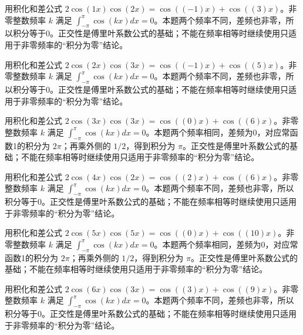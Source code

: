 \documentclass[12pt,fontset=fandol]{ctexart}
\begin{document}
\begin{solve}\label{ans:c16q13}
用积化和差公式 $2\cos(1x)\cos(2x)=\cos((-1)x)+\cos((3)x)$。非零整数频率 $k$ 满足 $\int_{-\pi}^\pi\cos(kx)dx=0$。本题两个频率不同，差频也非零，所以积分等于0。正交性是傅里叶系数公式的基础；不能在频率相等时继续使用只适用于非零频率的“积分为零”结论。
\end{solve}

\begin{solve}\label{ans:c16q14}
用积化和差公式 $2\cos(2x)\cos(3x)=\cos((-1)x)+\cos((5)x)$。非零整数频率 $k$ 满足 $\int_{-\pi}^\pi\cos(kx)dx=0$。本题两个频率不同，差频也非零，所以积分等于0。正交性是傅里叶系数公式的基础；不能在频率相等时继续使用只适用于非零频率的“积分为零”结论。
\end{solve}

\begin{solve}\label{ans:c16q15}
用积化和差公式 $2\cos(3x)\cos(3x)=\cos((0)x)+\cos((6)x)$。非零整数频率 $k$ 满足 $\int_{-\pi}^\pi\cos(kx)dx=0$。本题两个频率相同，差频为0，对应常函数1的积分为 $2\pi$；再乘外侧的 $1/2$，得到积分为 $\pi$。正交性是傅里叶系数公式的基础；不能在频率相等时继续使用只适用于非零频率的“积分为零”结论。
\end{solve}

\begin{solve}\label{ans:c16q16}
用积化和差公式 $2\cos(4x)\cos(2x)=\cos((2)x)+\cos((6)x)$。非零整数频率 $k$ 满足 $\int_{-\pi}^\pi\cos(kx)dx=0$。本题两个频率不同，差频也非零，所以积分等于0。正交性是傅里叶系数公式的基础；不能在频率相等时继续使用只适用于非零频率的“积分为零”结论。
\end{solve}

\begin{solve}\label{ans:c16q17}
用积化和差公式 $2\cos(5x)\cos(5x)=\cos((0)x)+\cos((10)x)$。非零整数频率 $k$ 满足 $\int_{-\pi}^\pi\cos(kx)dx=0$。本题两个频率相同，差频为0，对应常函数1的积分为 $2\pi$；再乘外侧的 $1/2$，得到积分为 $\pi$。正交性是傅里叶系数公式的基础；不能在频率相等时继续使用只适用于非零频率的“积分为零”结论。
\end{solve}

\begin{solve}\label{ans:c16q18}
用积化和差公式 $2\cos(6x)\cos(3x)=\cos((3)x)+\cos((9)x)$。非零整数频率 $k$ 满足 $\int_{-\pi}^\pi\cos(kx)dx=0$。本题两个频率不同，差频也非零，所以积分等于0。正交性是傅里叶系数公式的基础；不能在频率相等时继续使用只适用于非零频率的“积分为零”结论。
\end{solve}
\end{document}
